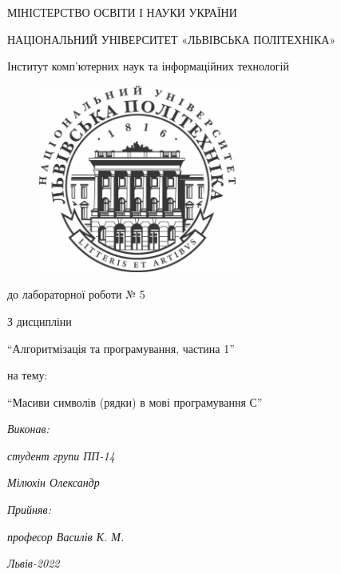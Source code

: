 \begin{titlepage}
\pagestyle{empty}
\begin{center}

	{\fontsize{14}{24}\selectfont МІНІСТЕРСТВО ОСВІТИ І НАУКИ УКРАЇНИ

	НАЦІОНАЛЬНИЙ УНІВЕРСИТЕТ «ЛЬВІВСЬКА ПОЛІТЕХНІКА»

	Інститут комп'ютерних наук та інформаційних технологій

	}

	\vspace{90.4pt} %
	\begin{figure}[h]
		\centering
		\includegraphics[width=6.5cm,keepaspectratio]{../../../lpnu.png}
	\end{figure}

	{\fontsize{18}{29}\selectfont{Звіт}

	{до лабораторної роботи № 5}

	{З дисципліни}

	{``Алгоритмізація та програмування, частина 1''}

	{на тему:}

	{``Масиви символів (рядки) в мові програмування С''}

	}
\end{center}

\vspace{12.1pt} %
	{\fontsize{14}{22.4}\selectfont
\begin{flushright}
	\textit{Виконав:}

	\textit{студент групи ПП-14}

	\textit{Мілюхін Олександр}

	\textit{Прийняв:}

	\textit{професор Василів К. М.}
\end{flushright}
\vspace{37.4pt} %
\begin{center}
\textit{Львів-2022}
\end{center}
	}
\end{titlepage}
